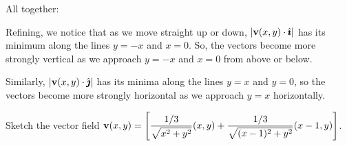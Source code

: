 \begin{solution}
All together:

\begin{center}
\end{center}

Refining, we notice that  as we move straight up or down, $|\mathbf{v}(x,y)\cdot \hat{\pmb{\imath}}|$ has its minimum along the lines $y=-x$ and $x=0$. So, the vectors become more strongly vertical as we approach $y=-x$ and $x=0$ from above or below.

Similarly, $|\mathbf{v}(x,y)\cdot \hat{\pmb{\jmath}}|$ has its minima along the lines $y=x$ and $y=0$, so the vectors become more strongly horizontal as we approach $y=x$ horizontally.

\begin{center}
\end{center}
\end{solution}




\begin{question}
Sketch the vector field $\displaystyle \mathbf{v}(x,y)=\left[\frac{1/3}{\sqrt{x^2+y^2}}(x,y)+\frac{1/3}{\sqrt{(x-1)^2+y^2}}(x-1,y)\right]$.


\end{question}

